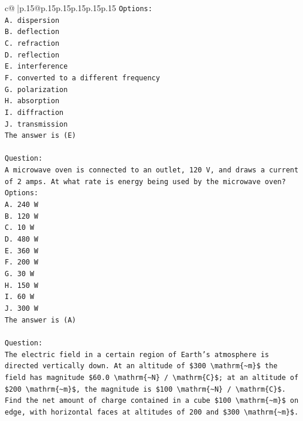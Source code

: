 \documentclass{article}
\begin{document}
{\begin{supertabular}{c@{$\;$}|p{.15\linewidth}@{}p{.15\linewidth}p{.15\linewidth}p{.15\linewidth}p{.15\linewidth}p{.15\linewidth}}
{{{\texttt{Options:} \\
\texttt{A. dispersion} \\
\texttt{B. deflection} \\
\texttt{C. refraction} \\
\texttt{D. reflection} \\
\texttt{E. interference} \\
\texttt{F. converted to a different frequency} \\
\texttt{G. polarization} \\
\texttt{H. absorption} \\
\texttt{I. diffraction} \\
\texttt{J. transmission} \\
\texttt{The answer is (E)} \\
\\ 
\texttt{Question:} \\
\texttt{A microwave oven is connected to an outlet, 120 V, and draws a current of 2 amps. At what rate is energy being used by the microwave oven?} \\
\texttt{Options:} \\
\texttt{A. 240 W} \\
\texttt{B. 120 W} \\
\texttt{C. 10 W} \\
\texttt{D. 480 W} \\
\texttt{E. 360 W} \\
\texttt{F. 200 W} \\
\texttt{G. 30 W} \\
\texttt{H. 150 W} \\
\texttt{I. 60 W} \\
\texttt{J. 300 W} \\
\texttt{The answer is (A)} \\
\\ 
\texttt{Question:} \\
\texttt{The electric field in a certain region of Earth's atmosphere is directed vertically down. At an altitude of \$300 \textbackslash{}mathrm\{\textasciitilde{}m\}\$ the field has magnitude \$60.0 \textbackslash{}mathrm\{\textasciitilde{}N\} / \textbackslash{}mathrm\{C\}\$; at an altitude of \$200 \textbackslash{}mathrm\{\textasciitilde{}m\}\$, the magnitude is \$100 \textbackslash{}mathrm\{\textasciitilde{}N\} / \textbackslash{}mathrm\{C\}\$. Find the net amount of charge contained in a cube \$100 \textbackslash{}mathrm\{\textasciitilde{}m\}\$ on edge, with horizontal faces at altitudes of 200 and \$300 \textbackslash{}mathrm\{\textasciitilde{}m\}\$.} \\
}}}
\end{supertabular}}
\end{document}
